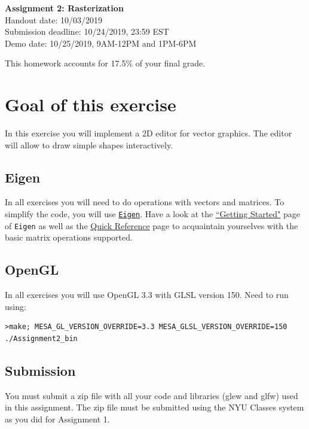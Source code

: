 \documentclass[11pt]{article}
\begin{document}
\hspace{50pt}

\begin{center}

{\Huge \textbf{Assignment 2: Rasterization}}\\
\vspace{10pt}
Handout date: 10/03/2019\\
Submission deadline: 10/24/2019,  23:59 EST\\
Demo date: 10/25/2019, 9AM-12PM and 1PM-6PM
\end{center}

\noindent This homework accounts for 17.5\% of your final grade. 

\section*{Goal of this exercise}
In this exercise you will implement a 2D editor for vector graphics. The editor will allow to draw simple shapes interactively.

\subsection*{Eigen}
In all exercises you will need to do operations with vectors and matrices. To simplify the code, you will use \href{http://eigen.tuxfamily.org/}{\texttt{Eigen}}. 
Have a look at the \href{http://eigen.tuxfamily.org/dox/GettingStarted.html}{``Getting Started"} page of \texttt{Eigen} as well as the \href{http://eigen.tuxfamily.org/dox/group__QuickRefPage.html}{Quick Reference} page to acquaintain yourselves with the basic matrix operations supported. 

\subsection*{OpenGL}
In all exercises you will use OpenGL 3.3 with GLSL version 150.
Need to run using: %
\begin{verbatim}
>make; MESA_GL_VERSION_OVERRIDE=3.3 MESA_GLSL_VERSION_OVERRIDE=150 ./Assignment2_bin
\end{verbatim}

\subsection*{Submission}

You must submit a zip file with all your code and libraries (glew and glfw) used in this assignment. The zip file must be submitted using the NYU Classes system as you did for Assignment 1. 
\end{document}
